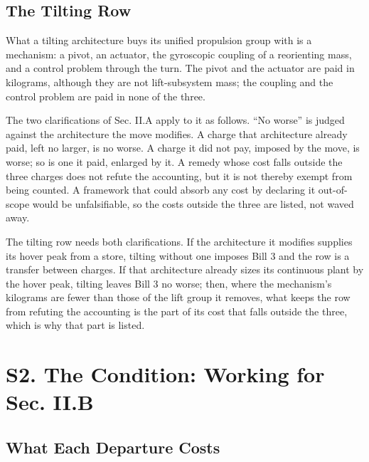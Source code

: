 \documentclass[journal]{new-aiaa}
\begin{document}
\subsection*{The Tilting Row}

What a tilting architecture buys its unified propulsion group with is a mechanism: a pivot, an actuator, the gyroscopic coupling of a reorienting mass, and a control problem through the turn. The pivot and the actuator are paid in kilograms, although they are not lift-subsystem mass; the coupling and the control problem are paid in none of the three.

The two clarifications of Sec. II.A apply to it as follows. ``No worse'' is judged against the architecture the move modifies. A charge that architecture already paid, left no larger, is no worse. A charge it did not pay, imposed by the move, is worse; so is one it paid, enlarged by it. A remedy whose cost falls outside the three charges does not refute the accounting, but it is not thereby exempt from being counted. A framework that could absorb any cost by declaring it out-of-scope would be unfalsifiable, so the costs outside the three are listed, not waved away.

The tilting row needs both clarifications. If the architecture it modifies supplies its hover peak from a store, tilting without one imposes Bill 3 and the row is a transfer between charges. If that architecture already sizes its continuous plant by the hover peak, tilting leaves Bill 3 no worse; then, where the mechanism's kilograms are fewer than those of the lift group it removes, what keeps the row from refuting the accounting is the part of its cost that falls outside the three, which is why that part is listed.

\section*{S2. The Condition: Working for Sec. II.B}

\subsection*{What Each Departure Costs}
\end{document}
